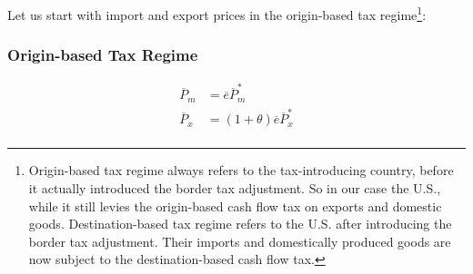Let us start with import and export prices in the origin-based tax regime\footnote{Origin-based tax regime always refers to the tax-introducing country, before it actually introduced the border tax adjustment. So in our case the U.S., while it still levies the origin-based cash flow tax on exports and domestic goods. Destination-based tax regime refers to the U.S. after introducing the border tax adjustment. Their imports and domestically produced goods are now subject to the destination-based cash flow tax.}:


\subsubsection*{Origin-based Tax Regime}

\begin{equation}\label{O.Tax}
\begin{aligned}
    \overline P_m &= \overline e\overline P^*_m \\
    \overline P_x &= \left( 1+\theta \right) \overline e\overline P^*_x \\
\end{aligned}
\end{equation}

